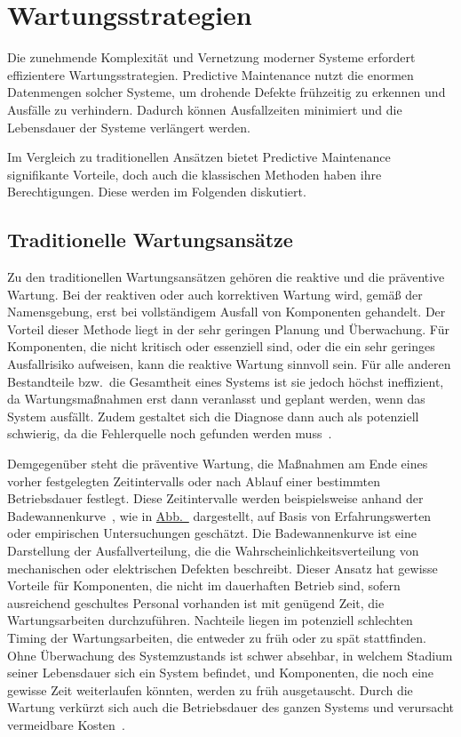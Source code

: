 \chapter{Wartungsstrategien}\label{ch:pdm_theorie}
Die zunehmende Komplexität und Vernetzung moderner Systeme erfordert effizientere Wartungsstrategien. Predictive Maintenance nutzt die
enormen Datenmengen solcher Systeme, um drohende Defekte frühzeitig zu erkennen und Ausfälle zu verhindern. Dadurch können
Ausfallzeiten minimiert und die Lebensdauer der Systeme verlängert werden.

Im Vergleich zu traditionellen Ansätzen bietet Predictive Maintenance signifikante Vorteile,
doch auch die klassischen Methoden haben ihre Berechtigungen. Diese werden im Folgenden diskutiert.

\section{Traditionelle Wartungsansätze}\label{sec:trad_maintenance}
Zu den traditionellen Wartungsansätzen gehören die reaktive und die präventive Wartung. Bei der reaktiven oder auch korrektiven
Wartung wird, gemäß der Namensgebung, erst bei vollständigem Ausfall von Komponenten gehandelt.
Der Vorteil dieser Methode liegt in der sehr geringen Planung und Überwachung. Für Komponenten,
die nicht kritisch oder essenziell sind, oder die ein sehr geringes Ausfallrisiko aufweisen, kann die reaktive Wartung sinnvoll sein.
Für alle anderen Bestandteile bzw.~die Gesamtheit eines Systems ist sie jedoch höchst ineffizient, da Wartungsmaßnahmen erst dann
veranlasst und geplant werden, wenn das System ausfällt. Zudem gestaltet sich die Diagnose dann auch als potenziell schwierig, da die
Fehlerquelle noch gefunden werden muss~\cite{Abdelli2022}.

Demgegenüber steht die präventive Wartung, die Maßnahmen am Ende eines vorher festgelegten Zeitintervalls oder nach Ablauf einer
bestimmten Betriebsdauer festlegt. Diese Zeitintervalle werden beispielsweise anhand der Badewannenkurve~\cite[S.~4]{Andrews2002},
wie in \hyperref[fig:bathtub]{Abb.~} dargestellt, auf Basis von Erfahrungswerten oder empirischen Untersuchungen geschätzt.
Die Badewannenkurve ist eine Darstellung der Ausfallverteilung, die die Wahrscheinlichkeitsverteilung von mechanischen oder elektrischen
Defekten beschreibt. Dieser Ansatz hat gewisse Vorteile für Komponenten, die nicht im dauerhaften Betrieb sind, sofern ausreichend geschultes Personal vorhanden
ist mit genügend Zeit, die Wartungsarbeiten durchzuführen. Nachteile liegen im potenziell schlechten Timing der Wartungsarbeiten, die
entweder zu früh oder zu spät stattfinden. Ohne Überwachung des Systemzustands ist schwer absehbar, in welchem Stadium seiner Lebensdauer
sich ein System befindet, und Komponenten, die noch eine gewisse Zeit weiterlaufen könnten, werden zu früh ausgetauscht. Durch die Wartung
verkürzt sich auch die Betriebsdauer des ganzen Systems und verursacht vermeidbare Kosten~\cite{Scheffer2004}.

